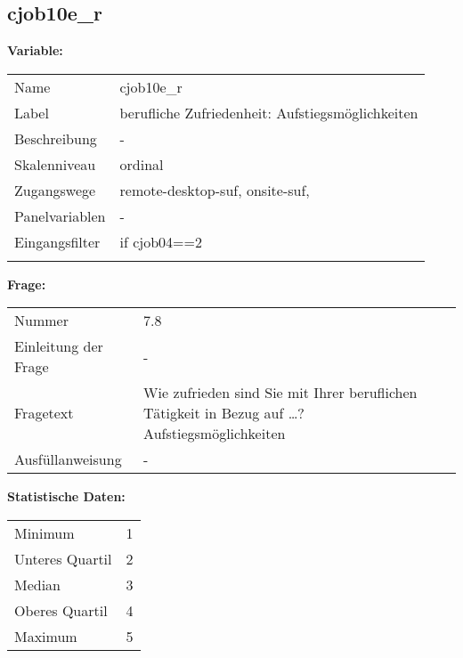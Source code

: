 	
	
	\subsection{cjob10e\_r}
	\label{subSection:cjob10e_r}

	\noindent\textbf{Variable:}\\
		\begin{tabular}{lL{11.3cm}}
			\label{tableVariable:cjob10e_r}
			Name & cjob10e\_r \\
			Label & berufliche Zufriedenheit: Aufstiegsmöglichkeiten \\
			Beschreibung & - \\
			Skalenniveau & ordinal \\
			Zugangswege &
				remote-desktop-suf,
				onsite-suf,
 \\
			Panelvariablen & -
			 \\
			Eingangsfilter & if cjob04==2 \\
 \\
		\end{tabular}

		\vspace*{1 cm}
		\noindent\textbf{Frage:}\\
		\begin{tabular}{lL{11.3cm}}
			\label{tableQuestion:cjob10e_r}
			Nummer & 7.8 \\
			Einleitung der Frage & - \\
			Fragetext & Wie zufrieden sind Sie mit Ihrer beruflichen Tätigkeit in Bezug auf …?
Aufstiegsmöglichkeiten \\
			Ausfüllanweisung & - \\
		\end{tabular}


		\vspace*{1 cm}
		\noindent\textbf{Statistische Daten:}\\
			\begin{tabular}{ll}
				\label{tableStatistics:cjob10e_r}
					Minimum & 1 \\
					Unteres Quartil & 2 \\
					Median & 3 \\
					Oberes Quartil & 4 \\
					Maximum & 5 \\
			\end{tabular}



